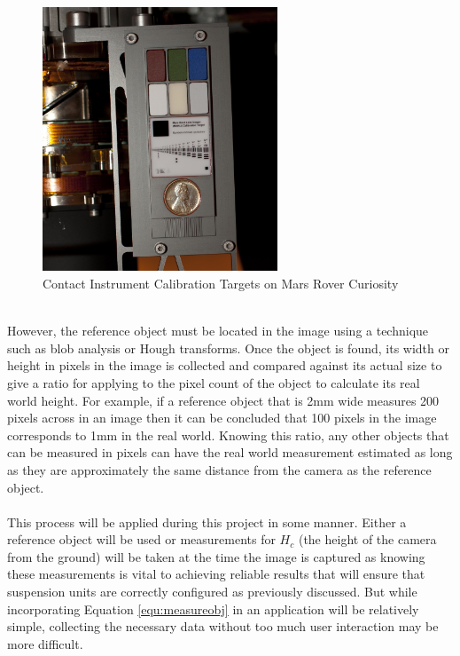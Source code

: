 	\begin{figure}[h!]
		\centering
		\includegraphics[width=7cm]{../images/curiosity_calibration_chart.jpg}
		\caption[Contact Instrument Calibration Targets on Mars Rover Curiosity]{Contact Instrument Calibration Targets on Mars Rover Curiosity \citep{curiosity_image_calibration}}
		\label{fig:curiosity_calibration_chart}
	\end{figure}\\
	However, the reference object must be located in the image using a technique such as \gls{blob} analysis or Hough transforms. Once the object is found, its width or height in pixels in the image is collected and compared against its actual size to give a ratio for applying to the pixel count of the object to calculate its real world height. For example, if a reference object that is 2mm wide measures 200 pixels across in an image then it can be concluded that 100 pixels in the image corresponds to 1mm in the real world. Knowing this ratio, any other objects that can be measured in pixels can have the real world measurement estimated as long as they are approximately the same distance from the camera as the reference object.
	\\\\
	This process will be applied during this project in some manner. Either a reference object will be used or measurements for $H_c$ (the height of the camera from the ground) will be taken at the time the image is captured as knowing these measurements is vital to achieving reliable results that will ensure that suspension units are correctly configured as previously discussed. But while incorporating Equation \ref{equ:measureobj} in an application will be relatively simple, collecting the necessary data without too much user interaction may be more difficult.